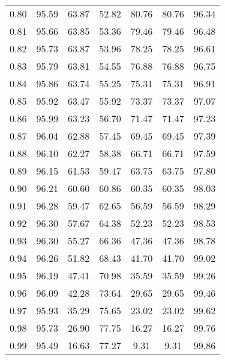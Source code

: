 \begin{tabular}{|c|c|c|c|c|c|c|}
      0.80 &     95.59 &     63.87 &      52.82 &   80.76 &      80.76 &         96.34 \\
      0.81 &     95.66 &     63.85 &      53.36 &   79.46 &      79.46 &         96.48 \\
      0.82 &     95.73 &     63.87 &      53.96 &   78.25 &      78.25 &         96.61 \\
      0.83 &     95.79 &     63.81 &      54.55 &   76.88 &      76.88 &         96.75 \\
      0.84 &     95.86 &     63.74 &      55.25 &   75.31 &      75.31 &         96.91 \\
      0.85 &     95.92 &     63.47 &      55.92 &   73.37 &      73.37 &         97.07 \\
      0.86 &     95.99 &     63.23 &      56.70 &   71.47 &      71.47 &         97.23 \\
      0.87 &     96.04 &     62.88 &      57.45 &   69.45 &      69.45 &         97.39 \\
      0.88 &     96.10 &     62.27 &      58.38 &   66.71 &      66.71 &         97.59 \\
      0.89 &     96.15 &     61.53 &      59.47 &   63.75 &      63.75 &         97.80 \\
      0.90 &     96.21 &     60.60 &      60.86 &   60.35 &      60.35 &         98.03 \\
      0.91 &     96.28 &     59.47 &      62.65 &   56.59 &      56.59 &         98.29 \\
      0.92 &     96.30 &     57.67 &      64.38 &   52.23 &      52.23 &         98.53 \\
      0.93 &     96.30 &     55.27 &      66.36 &   47.36 &      47.36 &         98.78 \\
      0.94 &     96.26 &     51.82 &      68.43 &   41.70 &      41.70 &         99.02 \\
      0.95 &     96.19 &     47.41 &      70.98 &   35.59 &      35.59 &         99.26 \\
      0.96 &     96.09 &     42.28 &      73.64 &   29.65 &      29.65 &         99.46 \\
      0.97 &     95.93 &     35.29 &      75.65 &   23.02 &      23.02 &         99.62 \\
      0.98 &     95.73 &     26.90 &      77.75 &   16.27 &      16.27 &         99.76 \\
      0.99 &     95.49 &     16.63 &      77.27 &    9.31 &       9.31 &         99.86 \\
\bottomrule
\end{tabular}
